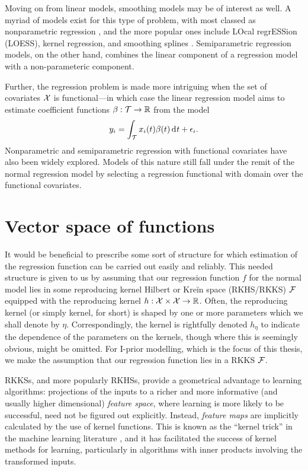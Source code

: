 \documentclass[11pt,twoside,openright,showframe]{report}
\begin{document}
Moving on from linear models, smoothing models may be of interest as well.
A myriad of models exist for this type of problem, with most classed as nonparametric regression \citep{wassermann2006all}, and the more popular ones include LOcal regrESSion (LOESS), kernel regression, and smoothing splines \citep{wahba1990spline}.
Semiparametric regression models, on the other hand, combines the linear component of a regression model with a non-parameteric component.

Further, the regression problem is made more intriguing when the set of covariates ${\mathcal X}$ is functional---in which case the linear regression model aims to estimate coefficient functions $\beta:{\mathcal T} \to \mathbb{R}$ from the model
%
\[
  y_i = \int_{\mathcal T} x_i(t)\beta(t) \operatorname{d}\hspace{0.5pt}\! t + \epsilon_i.
\]
%
Nonparametric and semiparametric regression with functional covariates \citep{ramsay2005functional} have also been widely explored.
Models of this nature still fall under the remit of the normal regression model by selecting a regression functional with domain over the functional covariates.

\section{Vector space of functions}

It would be beneficial to prescribe some sort of structure for which estimation of the regression function can be carried out easily and reliably. 
This needed structure is given to us by assuming that our regression function $f$ for the normal model lies in some reproducing kernel Hilbert or Kreĭn space (RKHS/RKKS) ${\mathcal F}$ equipped with the reproducing kernel $h:{\mathcal X} \times {\mathcal X} \to \mathbb{R}$.
Often, the reproducing kernel (or simply kernel, for short) is shaped by one or more parameters which we shall denote by $\eta$.
Correspondingly, the kernel is rightfully denoted $h_\eta$ to indicate the dependence of the parameters on the kernels, though where this is seemingly obvious, might be omitted.
For I-prior modelling, which is the focus of this thesis, we make the assumption that our regression function lies in a RKKS ${\mathcal F}$.

RKKSs, and more popularly RKHSs, provide a geometrical advantage to learning algorithms: projections of the inputs to a richer and more informative (and usually higher dimensional) \emph{feature space}, where learning is more likely to be successful, need not be figured out explicitly.
Instead, \emph{feature maps} are implicitly calculated by the use of kernel functions. 
This is known as the ``kernel trick'' in the machine learning literature \citep{hofmann2008kernel}, and it has facilitated the success of kernel methods for learning, particularly in algorithms with inner products involving the transformed inputs. 
\end{document}
